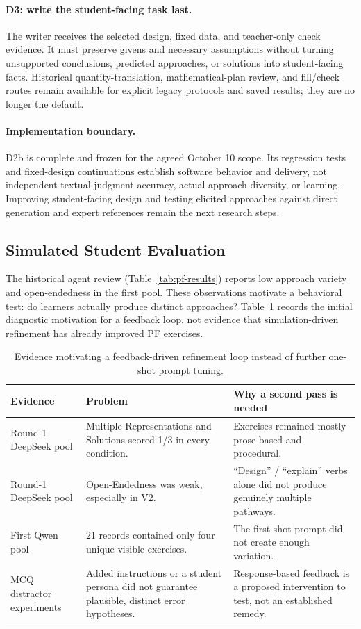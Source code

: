 \paragraph{D3: write the student-facing task last.} The writer receives the selected design, fixed data, and teacher-only check evidence. It must preserve givens and necessary assumptions without turning unsupported conclusions, predicted approaches, or solutions into student-facing facts. Historical quantity-translation, mathematical-plan review, and fill/check routes remain available for explicit legacy protocols and saved results; they are no longer the default.

\paragraph{Implementation boundary.} D2b is complete and frozen for the agreed October 10 scope. Its regression tests and fixed-design continuations establish software behavior and delivery, not independent textual-judgment accuracy, actual approach diversity, or learning. Improving student-facing design and testing elicited approaches against direct generation and expert references remain the next research steps.

\subsection{Simulated Student Evaluation}

The historical agent review (Table~\ref{tab:pf-results}) reports low approach variety and open-endedness in the first pool. These observations motivate a behavioral test: do learners actually produce distinct approaches? Table~\ref{tab:first-shot-problems} records the initial diagnostic motivation for a feedback loop, not evidence that simulation-driven refinement has already improved PF exercises.

\begin{table}[h]
\centering
\small
\begin{tabular}{@{}p{4.3cm}p{4.3cm}p{4.3cm}@{}}
\toprule
\textbf{Evidence} & \textbf{Problem} & \textbf{Why a second pass is needed} \\
\midrule
Round-1 DeepSeek pool & Multiple Representations and Solutions scored 1/3 in every condition. & Exercises remained mostly prose-based and procedural. \\
Round-1 DeepSeek pool & Open-Endedness was weak, especially in V2. & ``Design'' / ``explain'' verbs alone did not produce genuinely multiple pathways. \\
First Qwen pool & 21 records contained only four unique visible exercises. & The first-shot prompt did not create enough variation. \\
MCQ distractor experiments & Added instructions or a student persona did not guarantee plausible, distinct error hypotheses. & Response-based feedback is a proposed intervention to test, not an established remedy. \\
\bottomrule
\end{tabular}
\caption{Evidence motivating a feedback-driven refinement loop instead of further one-shot prompt tuning.}
\label{tab:first-shot-problems}
\end{table}

